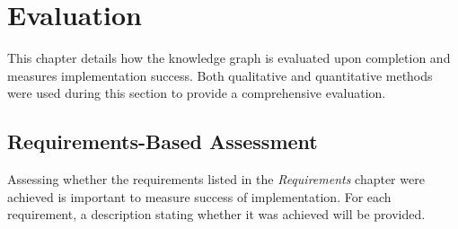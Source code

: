 \chapter{Evaluation}
This chapter details how the knowledge graph is evaluated upon completion and measures implementation success. Both qualitative and quantitative methods were used during this section to provide a comprehensive evaluation.

\section{Requirements-Based Assessment}
\hspace{0.5cm} Assessing whether the requirements listed in the \textit{Requirements} chapter were achieved is important to measure success of implementation. For each requirement, a description stating whether it was achieved will be provided. 

